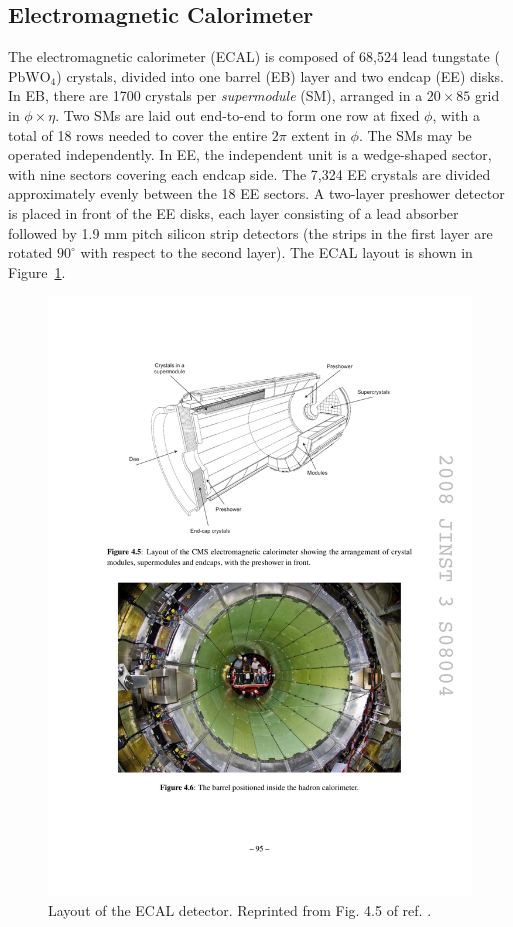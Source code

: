 \documentclass[dissertation.tex]{subfiles}
\begin{document}
\subsection{Electromagnetic Calorimeter}
\label{sec:Electromagnetic Calorimeter}

The electromagnetic calorimeter (ECAL) is composed of 68,524 lead tungstate ($\mbox{PbWO}_{4}$) crystals, divided into one barrel (EB) layer and two endcap (EE) disks.  In EB, there are 1700 crystals per \textit{supermodule} (SM), arranged in a $20\times85$ grid in $\phi\times\eta$.  Two SMs are laid out end-to-end to form one row at fixed $\phi$, with a total of 18 rows needed to cover the entire $2\pi$ extent in $\phi$.  The SMs may be operated independently.  In EE, the independent unit is a wedge-shaped sector, with nine sectors covering each endcap side.  The 7,324 EE crystals are divided approximately evenly between the 18 EE sectors.  A two-layer preshower detector is placed in front of the EE disks, each layer consisting of a lead absorber followed by 1.9 mm pitch silicon strip detectors (the strips in the first layer are rotated $90^{\circ}$ with respect to the second layer).  The ECAL layout is shown in Figure~\ref{fig:ECAL_layout}.

\begin{figure}
	\centering
	\includegraphics[scale=1.0]{ECAL_layout}
	\caption{Layout of the ECAL detector.  Reprinted from Fig. 4.5 of ref. \cite{1748-0221-3-08-S08004}.}
	\label{fig:ECAL_layout}
\end{figure}
\end{document}

